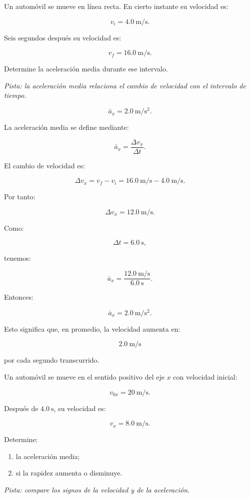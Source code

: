 ﻿\nivelbasico


\begin{ejercicio}
Un automóvil se mueve en línea recta. En cierto instante su velocidad es:

\[ v_i=\SI{4.0}{\meter\per\second}. \]

Seis segundos después su velocidad es:

\[ v_f=\SI{16.0}{\meter\per\second}. \]

Determine la aceleración media durante ese intervalo.

\textit{Pista: la aceleración media relaciona el cambio de velocidad con el intervalo de tiempo.}
\end{ejercicio}

\begin{respuesta}
\[ \boxed{\bar{a}_x=\SI{2.0}{\meter\per\second\squared}}. \]
\end{respuesta}

\begin{explicacion}
La aceleración media se define mediante:

\[ \bar{a}_x=\frac{\Delta v_x}{\Delta t}. \]

El cambio de velocidad es:

\[
\Delta v_x
=
v_f-v_i
=
\SI{16.0}{\meter\per\second}
-
\SI{4.0}{\meter\per\second}.
\]

Por tanto:

\[ \Delta v_x=\SI{12.0}{\meter\per\second}. \]

Como:

\[ \Delta t=\SI{6.0}{\second}, \]

tenemos:

\[
\bar{a}_x
=
\frac{\SI{12.0}{\meter\per\second}}
{\SI{6.0}{\second}}.
\]

Entonces:

\[ \boxed{\bar{a}_x=\SI{2.0}{\meter\per\second\squared}}. \]

Esto significa que, en promedio, la velocidad aumenta en:

\[ \SI{2.0}{\meter\per\second} \]

por cada segundo transcurrido.
\end{explicacion}


\begin{ejercicio}
Un automóvil se mueve en el sentido positivo del eje \(x\) con velocidad inicial:

\[ v_{0x}=\SI{20}{\meter\per\second}. \]

Después de \(\SI{4.0}{\second}\), su velocidad es:

\[ v_x=\SI{8.0}{\meter\per\second}. \]

Determine:

\begin{enumerate}[label=\alph*)]
    \item la aceleración media;
    \item si la rapidez aumenta o disminuye.
\end{enumerate}

\textit{Pista: compare los signos de la velocidad y de la aceleración.}
\end{ejercicio}

